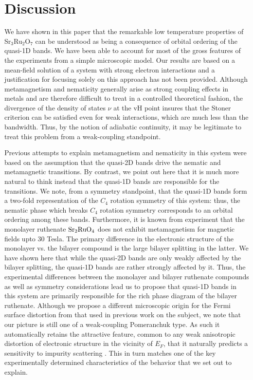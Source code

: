 \documentclass[prb,aps,amssymb,showpacs,twocolumn,amsmath,floatfix]{revtex4}
\def\SRO{Sr$_3$Ru$_2$O$_7$}
\begin{document}
\section{Discussion}

We have shown in this paper that the remarkable low temperature properties of \SRO 
can be understood as being a consequence of orbital ordering of the quasi-1D bands.  
We have been able to account for most of the gross features of the experiments 
from a simple microscopic model.  
Our results are based on a mean-field solution of a system with strong electron interactions and a justification for focusing solely on this approach has not been provided.  Although 
metamagnetism and nematicity generally arise as strong coupling effects in metals and are therefore difficult to treat in a controlled theoretical fashion, 
 the divergence of the density of states $\nu$ at the  
vH point 
insures that the Stoner criterion can be satisfied even for  weak interactions, which are  much less than the bandwidth.  Thus, by the notion of 
adiabatic continuity, it may be legitimate to treat this problem from a weak-coupling standpoint.      

Previous attempts to explain metamagnetism and nematicity in this system \cite{Kee2005, Honerkamp2005, Berridge2009} were based on the
assumption that the quasi-2D bands drive the nematic and metamagnetic transitions.  By contrast, 
we point out here that it is much more natural to think instead that the quasi-1D bands are 
responsible for the transitions.  We note, from a symmetry standpoint, that the quasi-1D bands form a 
two-fold representation of the $C_4$ rotation symmetry of this system: thus, the nematic phase which 
breaks $C_4$ rotation symmetry corresponds to an orbital ordering among these bands.  Furthermore, 
it is known from experiment that the monolayer ruthenate ${\rm Sr}_2{\rm Ru}{\rm O}_4$ does not exhibit 
metamagnetism for magnetic fields upto 30 Tesla.  The primary difference in the electronic structure 
of the monolayer vs. the bilayer compound is the large bilayer splitting in the latter.  We have shown 
here that while the quasi-2D bands are only weakly affected by the bilayer splitting, the quasi-1D bands 
are rather strongly affected by it.  Thus, the experimental differences between the monolayer and bilayer 
ruthenate compounds as well as symmetry considerations lead us to propose that quasi-1D bands in this system 
are primarily responsible for the rich phase diagram of the bilayer ruthenate.  
Although we propose a different microscopic origin for the Fermi surface distortion from that used in previous work on the subject, we note that our picture is still one of a weak-coupling Pomeranchuk type.  As such it automatically retains the attractive feature, common to any weak anisotropic distortion of electronic structure in the vicinity of $E_F$, that it naturally predicts a sensitivity to impurity scattering \cite{Ho2008}.  
This in turn matches one of the key experimentally determined characteristics of the behavior that we set out to explain.
\end{document}
